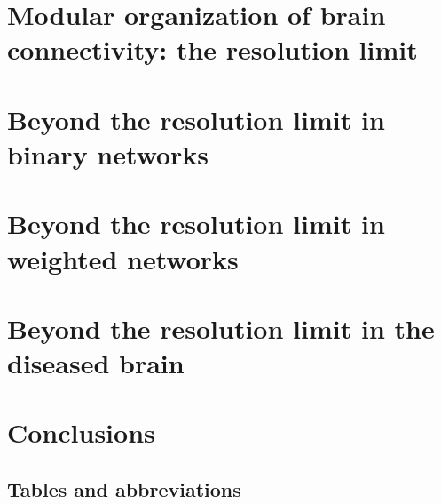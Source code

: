 \chapter{Modular organization of brain connectivity: the resolution limit}
\label{chap:modularorganization}
\vspace{2em}


\chapter{Beyond the resolution limit in binary networks}\label{chap:beyondresolutionlimitbinarynetworks}


\chapter{Beyond the resolution limit in weighted networks}
\label{chap:beyondresolutionlimitweightednetworks}


\chapter{Beyond the resolution limit in the diseased brain}



\chapter{Conclusions}





\begin{appendices}
\chapter{Tables and abbreviations}


%
\end{appendices}


